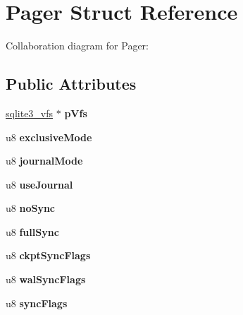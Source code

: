 \hypertarget{struct_pager}{\section{Pager Struct Reference}
\label{struct_pager}
}


Collaboration diagram for Pager\+:
\subsection*{Public Attributes}
\begin{DoxyCompactItemize}
\item 
\hypertarget{struct_pager_affa78e08a7f691a4c8f7043e0b4c9212}{\hyperlink{structsqlite3__vfs}{sqlite3\+\_\+vfs} $\ast$ {\bfseries p\+Vfs}}\label{struct_pager_affa78e08a7f691a4c8f7043e0b4c9212}

\item 
\hypertarget{struct_pager_a5cbccc156e07d6226cb65a7ab05ac116}{u8 {\bfseries exclusive\+Mode}}\label{struct_pager_a5cbccc156e07d6226cb65a7ab05ac116}

\item 
\hypertarget{struct_pager_a9ad7bd09f1c9323d943ee17ddf42e46e}{u8 {\bfseries journal\+Mode}}\label{struct_pager_a9ad7bd09f1c9323d943ee17ddf42e46e}

\item 
\hypertarget{struct_pager_af7783f866150d7e322c28cb324ad85d6}{u8 {\bfseries use\+Journal}}\label{struct_pager_af7783f866150d7e322c28cb324ad85d6}

\item 
\hypertarget{struct_pager_ae943093a3ccbfbf264ccf3c8a52edac1}{u8 {\bfseries no\+Sync}}\label{struct_pager_ae943093a3ccbfbf264ccf3c8a52edac1}

\item 
\hypertarget{struct_pager_abae5c9c3d85120ae266acc4c9a355b86}{u8 {\bfseries full\+Sync}}\label{struct_pager_abae5c9c3d85120ae266acc4c9a355b86}

\item 
\hypertarget{struct_pager_a4543ec92953e7bda49b3ed4f0bdab890}{u8 {\bfseries ckpt\+Sync\+Flags}}\label{struct_pager_a4543ec92953e7bda49b3ed4f0bdab890}

\item 
\hypertarget{struct_pager_aa8c8c2d893e4d2165f089ddde3e85103}{u8 {\bfseries wal\+Sync\+Flags}}\label{struct_pager_aa8c8c2d893e4d2165f089ddde3e85103}

\item 
\hypertarget{struct_pager_ac7f90d27da63090369a0e44a0bceb525}{u8 {\bfseries sync\+Flags}}\label{struct_pager_ac7f90d27da63090369a0e44a0bceb525}


\end{DoxyCompactItemize}
